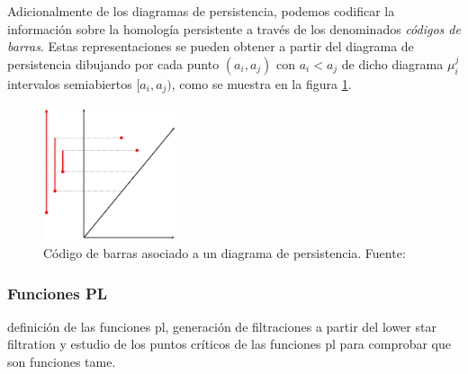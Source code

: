 Adicionalmente de los diagramas de persistencia, podemos codificar la información sobre la homología persistente a través de los denominados \emph{códigos de barras}. Estas representaciones se pueden obtener a partir del diagrama de persistencia dibujando por cada punto $(a_i, a_j)$ con $a_i < a_j$ de dicho diagrama $\mu_{i}^{j}$ intervalos semiabiertos $[a_i, a_j)$, como se muestra en la figura \ref{ref:codigoBarras}.

\begin{figure}[!ht]
\centering
\includegraphics[width=0.35\textwidth]{include/figuras/The-Persistence-Diagram-Associated-to-a-Barcode.png} 
\caption{Código de barras asociado a un diagrama de persistencia. Fuente: \cite{articuloJustin}}
\label{ref:codigoBarras}
\end{figure}

\subsubsection*{Funciones PL}
definición de las funciones pl, generación de filtraciones a partir del lower star filtration y estudio de los puntos críticos  de las funciones pl para comprobar que son funciones tame.



